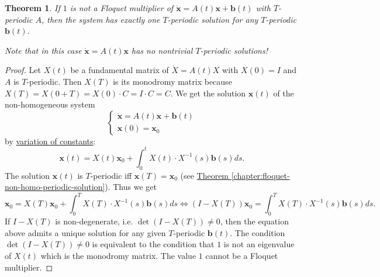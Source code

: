 \documentclass[hidelinks,a4paper, 11pt]{article}
\theoremstyle{plain}
\newtheorem{theorem}{Theorem}
\theoremstyle{break}
\theoremstyle{plain}
\theoremstyle{definition}
\begin{document}
{\begin{theorem}
	If $1$ is not a Floquet multiplier of $\mathbf{\dot x} = A(t)\mathbf x + \mathbf b(t)$ with $T$-periodic $A$, then the system has exactly one $T$-periodic solution for any $T$-periodic $\mathbf b(t)$.
	
	Note that in this case $\mathbf{\dot x} = A(t)\mathbf x$ has no nontrivial $T$-periodic solutions!
\end{theorem}

\begin{proof}
	Let $X(t)$ be a fundamental matrix of $\dot X = A(t)X$ with $X(0) = I$ and $A$ is $T$-periodic. Then $X(T)$ is its monodromy matrix because $X(T) = X(0+T) = X(0) \cdot C = I\cdot C = C$. We get the solution $\mathbf x(t)$ of the non-homogeneous system 
	\[
		\begin{cases}
			\mathbf{\dot x} = A(t)\mathbf x + \mathbf b(t) \\
			\mathbf{x}(0) = \mathbf x_0
		\end{cases}
	\]
	by \hyperref[formula:variation-of-constants]{variation of constants}:
	\[
		\mathbf x(t) = X(t)\mathbf x_0 + \int^t_0 X(t) \cdot X^{-1}(s)\mathbf b(s)ds.
	\]
	The solution $\mathbf x(t)$ is $T$-periodic iff $\mathbf x(T) = \mathbf x_0$ (see \hyperref[chapter:floquet-non-homo-periodic-solution]{Theorem \ref{chapter:floquet-non-homo-periodic-solution}}). Thus we get
	\[
		\mathbf x_0 = X(T)\mathbf x_0 + \int^T_0 X(T) \cdot X^{-1}(s)\mathbf b(s)ds \iff (I-X(T))\mathbf x_0 =  \int^T_0 X(T) \cdot X^{-1}(s)\mathbf b(s)ds. 
	\]
	If $I-X(T)$ is non-degenerate, i.e. $\det(I-X(T)) \neq 0$, then the equation above admits a unique solution for any given $T$-periodic $\mathbf b(t)$. The condition $\det(I-X(T)) \neq 0$ is equivalent to the condition that $1$ is not an eigenvalue of $X(t)$ which is the monodromy matrix. The value $1$ cannot be a Floquet multiplier.
\end{proof}

}
\end{document}
